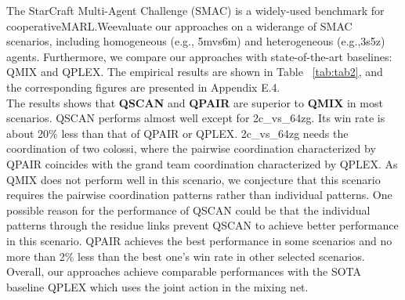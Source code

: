     The StarCraft Multi-Agent Challenge (SMAC)\cite{r7} is a widely-used benchmark for cooperativeMARL.Weevaluate our approaches on a widerange of SMAC scenarios, including homogeneous (e.g., 5mvs6m) and heterogeneous (e.g.,3s5z) agents. Furthermore, we compare our approaches with state-of-the-art baselines: QMIX and QPLEX. The empirical results are shown in Table ~\ref{tab:tab2}, and the corresponding figures are presented in Appendix E.4.\\
    
        The results shows that \textbf{QSCAN} and \textbf{QPAIR} are superior to \textbf{QMIX} in most scenarios. QSCAN performs 
        almost well except for 2c\_vs\_64zg. Its win rate is about 20\% less than that of QPAIR or QPLEX. 
        2c\_vs\_64zg needs the coordination of two colossi, where the pairwise coordination characterized 
        by QPAIR coincides with the grand team coordination characterized by QPLEX. As QMIX does not 
        perform well in this scenario, we conjecture that this scenario requires the pairwise coordination 
        patterns rather than individual patterns. One possible reason for the performance of QSCAN could be 
        that the individual patterns through the residue links prevent QSCAN to achieve better performance in 
        this scenario. QPAIR achieves the best performance in some scenarios and no more than 2\% less 
        than the best one's win rate in other selected scenarios. Overall, our approaches achieve comparable 
        performances with the SOTA baseline QPLEX which uses the joint action in the mixing net.